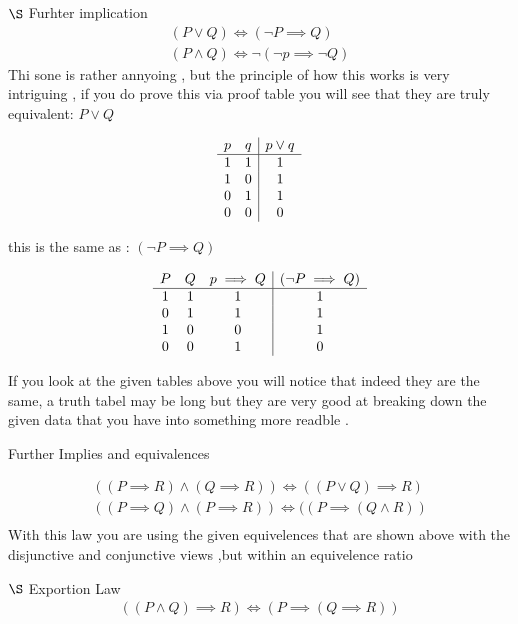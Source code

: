 \documentclass{article}
\theoremstyle{mytheoremstyle}
\theoremstyle{mytheoremstyle}
\theoremstyle{myproblemstyle}
\begin{document}
\item  $\S$ Furhter implication
\[\begin{array}{c}
    (P \lor Q) \iff (\neg P \implies Q) \\
    (P \land Q) \iff \neg(\neg p \implies \neg Q)
\end{array}\]
Thi sone is rather annyoing , but the principle of how this works is very intriguing , if you do prove this via proof table you will see that they are truly equivalent:
$P \lor Q$

\[\begin{array}{c c | c}
    p & q & p \lor q \\
    \hline
    1 & 1 & 1 \\
    1 & 0 & 1 \\
    0 & 1 & 1 \\
    0 & 0 & 0 \\
\end{array}\]



this is the same as :
$(\neg P \implies Q) $


\[\begin{array}{c c c | c}
    P & Q & p \implies Q & (\neg P \implies Q)\\
    \hline
    1 & 1 & 1 & 1 \\
    0 & 1 & 1 & 1 \\
    1 & 0 & 0 & 1 \\
    0 & 0 & 1 & 0 \\

\end{array}\]

If you look at the given tables above you will notice that indeed they are the same, a truth tabel may be long but they are very good at breaking down the given data that you have into something more readble .

\item Further Implies and equivalences

\[\begin{array}{c}
    ((P \implies R) \land (Q \implies R)) \iff ((P \lor Q) \implies R)\\
    ((P \implies Q) \land (P \implies R)) \iff ((P \implies (Q \land R)) \\
\end{array}\]
With this law you are using the given equivelences that are shown above with the disjunctive and conjunctive views ,but within an equivelence ratio


\item  $\S$ Exportion Law
\[\begin{array}{c}
    ((P \land Q) \implies R) \iff (P \implies (Q \implies R))
\end{array}\]
\end{document}
